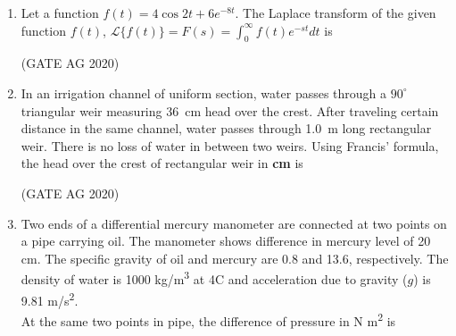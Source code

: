 \documentclass[journal]{IEEEtran}
\begin{document}
\begin{enumerate}
\medskip

\item 
Let a function $f(t) = 4\cos{2t} + 6e^{-8t}$. The Laplace transform of the given function $f(t)$, $\mathcal{L}\{f(t)\} = F(s) = \int_0^\infty f(t)e^{-st}dt$ is

\begin{enumerate}
\end{enumerate}
\hfill(GATE AG 2020)\\

\medskip

\item 
In an irrigation channel of uniform section, water passes through a $90^\circ$ triangular weir measuring 36~cm head over the crest. After traveling certain distance in the same channel, water passes through 1.0~m long rectangular weir. There is no loss of water in between two weirs. Using Francis' formula, the head over the crest of rectangular weir in \textbf{cm} is

\begin{enumerate}
\end{enumerate}
\hfill(GATE AG 2020)\\

\medskip

\item
Two ends of a differential mercury manometer are connected at two points on a pipe carrying oil. The manometer shows difference in mercury level of 20 cm. The specific gravity of oil and mercury are 0.8 and 13.6, respectively. The density of water is 1000 kg/m\textsuperscript{3} at 4\textdegree C and acceleration due to gravity ($g$) is 9.81 m/s\textsuperscript{2}.\\
At the same two points in pipe, the difference of pressure in N m\textsuperscript{2} is


\end{enumerate}
\end{document}
